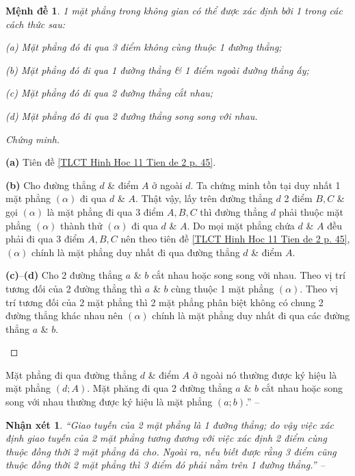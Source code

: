 \documentclass[oneside]{book}
\numberwithin{equation}{section}
\newtheorem{nhanxet}{Nhận xét}[section]
\newtheorem{menhde}{Mệnh đề}[section]
\begin{document}
\begin{menhde}
	1 mặt phẳng trong không gian có thể được xác định bởi 1 trong các cách thức sau:
	\begin{enumerate*}
		\item[(a)] Mặt phẳng đó đi qua 3 điểm không cùng thuộc 1 đường thẳng;
		\item[(b)] Mặt phẳng đó đi qua 1 đường thẳng \& 1 điểm ngoài đường thẳng ấy;
		\item[(c)] Mặt phẳng đó đi qua 2 đường thẳng cắt nhau;
		\item[(d)] Mặt phẳng đó đi qua 2 đưởng thẳng song song với nhau.
	\end{enumerate*}
\end{menhde}

\begin{proof}[Chứng minh]
	\begin{enumerate*}
		\item[\textbf{(a)}] Tiên đề \ref{TLCT Hinh Hoc 11 Tien de 2 p. 45}.
		\item[\textbf{(b)}] Cho đường thẳng $d$ \& điểm $A$ ở ngoài $d$. Ta chứng minh tồn tại duy nhất 1 mặt phẳng $(\alpha)$ đi qua $d$ \& $A$. Thật vậy, lấy trên đường thẳng $d$ 2 điểm $B,C$ \& gọi $(\alpha)$ là mặt phẳng đi qua 3 điểm $A,B,C$ thì đường thẳng $d$ phải thuộc mặt phẳng $(\alpha)$ thành thử $(\alpha)$ đi qua $d$ \& $A$. Do mọi mặt phẳng chứa $d$ \& $A$ đều phải đi qua 3 điểm $A,B,C$ nên theo tiên đề \ref{TLCT Hinh Hoc 11 Tien de 2 p. 45}, $(\alpha)$ chính là mặt phẳng duy nhất đi qua đường thẳng $d$ \& điểm $A$.
		\item[\textbf{(c)}--\textbf{(d)}] Cho 2 đường thẳng $a$ \& $b$ cắt nhau hoặc song song với nhau. Theo vị trí tương đối của 2 đường thẳng thì $a$ \& $b$ cùng thuộc 1 mặt phẳng $(\alpha)$. Theo vị trí tương đối của 2 mặt phẳng thì 2 mặt phẳng phân biệt không có chung 2 đường thẳng khác nhau nên $(\alpha)$ chính là mặt phẳng duy nhất đi qua các đường thẳng $a$ \& $b$.
	\end{enumerate*}
\end{proof}
Mặt phẳng đi qua đường thẳng $d$ \& điểm $A$ ở ngoài nó thường được ký hiệu là mặt phẳng $(d;A)$. Mặt phăng đi qua 2 đường thẳng $a$ \& $b$ cắt nhau hoặc song song với nhau thường được ký hiệu là mặt phẳng $(a;b)$.'' -- \cite[pp. 48--49]{TL_chuyen_Toan_Hinh_Hoc_11}

\begin{nhanxet}
	``Giao tuyến của 2 mặt phẳng là 1 đường thẳng; do vậy việc xác định giao tuyến của 2 mặt phẳng tương đương với việc xác định 2 điểm cùng thuộc đồng thời 2 mặt phẳng đã cho. Ngoài ra, nếu biết được rằng 3 điểm cũng thuộc đồng thời 2 mặt phẳng thì 3 điểm đó phải nằm trên 1 đường thẳng.'' -- \cite[p. 50]{TL_chuyen_Toan_Hinh_Hoc_11}
\end{nhanxet}
\end{document}
